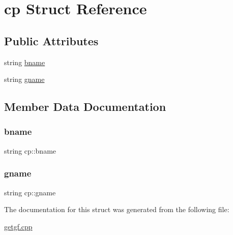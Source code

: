 \hypertarget{structcp}{}\section{cp Struct Reference}
\label{structcp}
\subsection*{Public Attributes}
\begin{DoxyCompactItemize}
\item 
string \hyperlink{structcp_a5c0f14498ef91b80df382a4fa0ff07a6}{bname}
\item 
string \hyperlink{structcp_a778f4ec05a16b4c88a219f3e800d1aac}{gname}
\end{DoxyCompactItemize}


\subsection{Member Data Documentation}
\mbox{\label{structcp_a5c0f14498ef91b80df382a4fa0ff07a6}} 
\subsubsection{\texorpdfstring{bname}{bname}}
{\footnotesize\ttfamily string cp\+::bname}

\mbox{\label{structcp_a778f4ec05a16b4c88a219f3e800d1aac}} 
\subsubsection{\texorpdfstring{gname}{gname}}
{\footnotesize\ttfamily string cp\+::gname}



The documentation for this struct was generated from the following file\+:\begin{DoxyCompactItemize}
\item 
\hyperlink{getgf_8cpp}{getgf.\+cpp}\end{DoxyCompactItemize}
